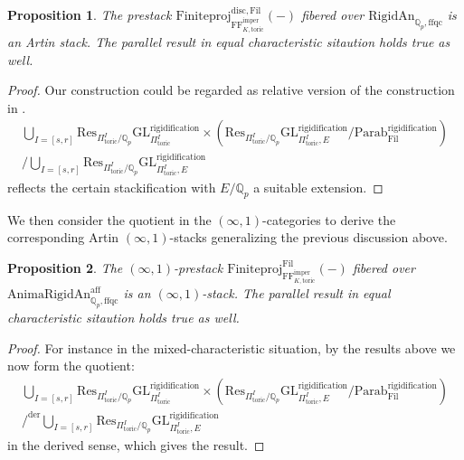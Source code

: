 \documentclass[12pt]{article}
\newtheorem{proposition}{Proposition}
\begin{document}
\begin{proposition}
The prestack $\mathrm{Finiteproj}^{\mathrm{disc},\mathrm{Fil}}_{\mathrm{FF}^\mathrm{imper}_{K,\mathrm{toric}}}(-)$ fibered over $\mathrm{RigidAn}_{\mathbb{Q}_p,\mathrm{ffqc}}$ is an Artin stack. The parallel result in equal characteristic sitaution holds true as well.	
\end{proposition}

\begin{proof}
Our construction could be regarded as relative version of the construction in \cite[Section 4.1]{He1}. 
\begin{align}
\bigcup_{I=[s,r]}\mathrm{Res}_{\Pi^I_\mathrm{toric}/\mathbb{Q}_p}\mathrm{GL}^\mathrm{rigidification}_{\Pi^I_\mathrm{toric}}\times \left(\mathrm{Res}_{\Pi^I_\mathrm{toric}/\mathbb{Q}_p}\mathrm{GL}^\mathrm{rigidification}_{\Pi^I_\mathrm{toric},E}/\mathrm{Parab}^\mathrm{rigidification}_\mathrm{Fil}\right)\\
/\bigcup_{I=[s,r]}\mathrm{Res}_{\Pi^I_\mathrm{toric}/\mathbb{Q}_p}\mathrm{GL}^\mathrm{rigidification}_{\Pi^I_\mathrm{toric},E}
\end{align}
reflects the certain stackification with $E/\mathbb{Q}_p$ a suitable extension.
\end{proof}



\indent We then consider the quotient in the $(\infty,1)$-categories to derive the corresponding Artin $(\infty,1)$-stacks generalizing the previous discussion above. 



\begin{proposition}
The $(\infty,1)$-prestack $\mathrm{Finiteproj}^{\mathrm{Fil}}_{\mathrm{FF}^\mathrm{imper}_{K,\mathrm{toric}}}(-)$ fibered over $\mathrm{AnimaRigidAn}^\mathrm{aff}_{\mathbb{Q}_p,\mathrm{ffqc}}$ is an $(\infty,1)$-stack. The parallel result in equal characteristic sitaution holds true as well.	
\end{proposition}
 
\begin{proof}
For instance in the mixed-characteristic situation, by the results above we now form the quotient:
\begin{align}
\bigcup_{I=[s,r]}\mathrm{Res}_{\Pi^I_\mathrm{toric}/\mathbb{Q}_p}\mathrm{GL}^\mathrm{rigidification}_{\Pi^I_\mathrm{toric}}\times \left(\mathrm{Res}_{\Pi^I_\mathrm{toric}/\mathbb{Q}_p}\mathrm{GL}^\mathrm{rigidification}_{\Pi^I_\mathrm{toric},E}/\mathrm{Parab}^\mathrm{rigidification}_\mathrm{Fil}\right)\\
/^\mathrm{der}\bigcup_{I=[s,r]}\mathrm{Res}_{\Pi^I_\mathrm{toric}/\mathbb{Q}_p}\mathrm{GL}^\mathrm{rigidification}_{\Pi^I_\mathrm{toric},E}
\end{align}	
in the derived sense, which gives the result.
\end{proof}
\end{document}

